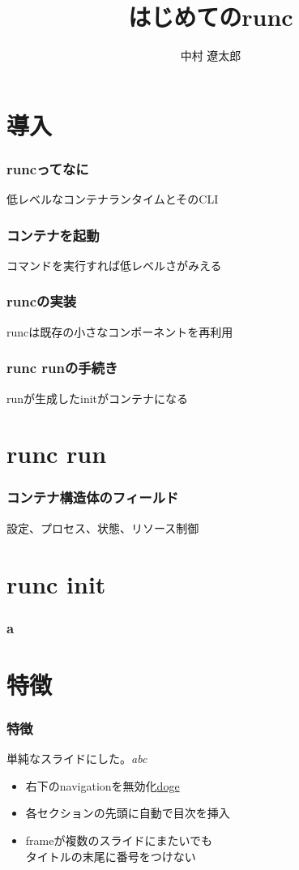 \documentclass[unicode, 14pt]{beamer}
\title{はじめてのrunc}
\author{中村 遼太郎}
\begin{document}
\begin{frame}
\titlepage
\end{frame}
\section{導入}
\begin{frame}[t]
  \frametitle{runcってなに}
  低レベルなコンテナランタイムとそのCLI
\end{frame}
\begin{frame}[t]
  \frametitle{コンテナを起動}
  コマンドを実行すれば低レベルさがみえる
\end{frame}
\begin{frame}[t]
  \frametitle{runcの実装}
  runcは既存の小さなコンポーネントを再利用
\end{frame}
\begin{frame}[t]
  \frametitle{runc runの手続き}
  runが生成したinitがコンテナになる
\end{frame}
\section{runc run}
\begin{frame}[t]
  \frametitle{コンテナ構造体のフィールド}
  設定、プロセス、状態、リソース制御
\end{frame}
\begin{frame}[t]
  \frametitle{}
\end{frame}
\section{runc init}

\begin{frame}[t]
  \frametitle{a}
\end{frame}
\section{特徴}
\begin{frame}[t]
  \frametitle{特徴}
    単純なスライドにした。\textit{abc}
  \vspace{0.2\paperheight}
  \begin{itemize}
    \item 右下のnavigationを無効化\href{https://google.com}{doge}
    \item 各セクションの先頭に自動で目次を挿入
    \item frameが複数のスライドにまたいでも\\タイトルの末尾に番号をつけない
  \end{itemize}
\end{frame}
\end{document}

